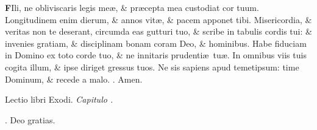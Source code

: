 \documentclass[letter,11pt]{book}
\makeatletter
\DeclareRobustCommand{\Rbar}{\vers@resp{0pt}{R}}
\newcommand{\vers@resp@sym}{\raisebox{0.2ex}{\rotatebox[origin=c]{-20}{$\m@th\rceil$}}}
\newcommand{\vers@resp}[2]{%
  {\ooalign{\hidewidth\kern#1\vers@resp@sym\hidewidth\cr#2\cr}}%
}%
\def\R{\color{Red} \Rbar . \color{black}}
\makeatother
\begin{document}
\begin{multicols*}{2}
\lettrine[lines=2]{\bfseries \color{Red} F}{}Ili, ne obliviscaris legis me\ae , \& pr\ae cepta mea custodiat cor tuum. Longitudinem enim dierum, \& annos vit\ae , \& pacem apponet tibi. Misericordia, \& veritas non te deserant, circumda eas gutturi tuo, \& scribe in tabulis cordis tui: \& invenies gratiam, \& disciplinam bonam coram Deo, \& hominibus. Habe fiduciam in Domino ex toto corde tuo, \& ne innitaris prudenti\ae \ tu\ae . In omnibus viis tuis cogita illum, \& ipse diriget gressus tuos. Ne sis sapiens apud temetipsum: time Dominum, \& recede a malo. \R Amen.
\vspace{-.5em} \begin{center} {\color{Red} L}ectio libri Exodi. \itshape Capitulo . \color{black} \end{center} \vspace{-.5em}
\par \noindent \R Deo gratias.

\end{multicols*}
\end{document}
